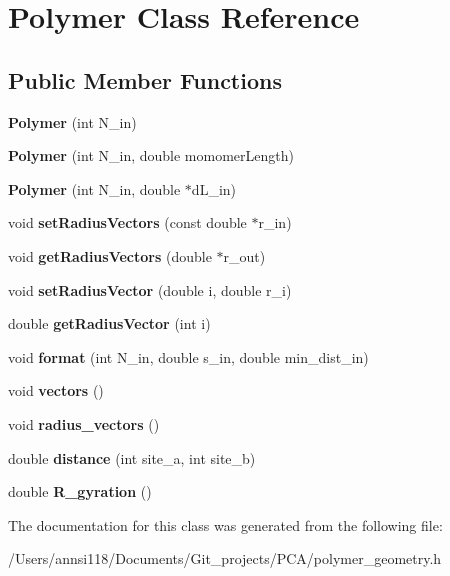 \hypertarget{class_polymer}{}\section{Polymer Class Reference}
\label{class_polymer}
\subsection*{Public Member Functions}
\begin{DoxyCompactItemize}
\item 
\hypertarget{class_polymer_aeef14f876a6b3b31b3be3fd789f9142d}{}\label{class_polymer_aeef14f876a6b3b31b3be3fd789f9142d} 
{\bfseries Polymer} (int N\+\_\+in)
\item 
\hypertarget{class_polymer_ad009faecb341e6aaf21fd425c99c4b70}{}\label{class_polymer_ad009faecb341e6aaf21fd425c99c4b70} 
{\bfseries Polymer} (int N\+\_\+in, double momomer\+Length)
\item 
\hypertarget{class_polymer_ac859321a8dd1b5d78822e98e53645ad3}{}\label{class_polymer_ac859321a8dd1b5d78822e98e53645ad3} 
{\bfseries Polymer} (int N\+\_\+in, double $\ast$d\+L\+\_\+in)
\item 
\hypertarget{class_polymer_ad540918d3d218b44535e590c559c28b9}{}\label{class_polymer_ad540918d3d218b44535e590c559c28b9} 
void {\bfseries set\+Radius\+Vectors} (const double $\ast$r\+\_\+in)
\item 
\hypertarget{class_polymer_ae82c830e6fd23af29f0eed75cffd00ad}{}\label{class_polymer_ae82c830e6fd23af29f0eed75cffd00ad} 
void {\bfseries get\+Radius\+Vectors} (double $\ast$r\+\_\+out)
\item 
\hypertarget{class_polymer_aba8c125cc0c6f2f66f4bb9b5457d004a}{}\label{class_polymer_aba8c125cc0c6f2f66f4bb9b5457d004a} 
void {\bfseries set\+Radius\+Vector} (double i, double r\+\_\+i)
\item 
\hypertarget{class_polymer_a123e7f967d9173b22b2f86a36062a0da}{}\label{class_polymer_a123e7f967d9173b22b2f86a36062a0da} 
double {\bfseries get\+Radius\+Vector} (int i)
\item 
\hypertarget{class_polymer_a625eaf1280ab523a07fa666ab9f8c69b}{}\label{class_polymer_a625eaf1280ab523a07fa666ab9f8c69b} 
void {\bfseries format} (int N\+\_\+in, double s\+\_\+in, double min\+\_\+dist\+\_\+in)
\item 
\hypertarget{class_polymer_a739c048d8c8a435b7c99d87546e229f9}{}\label{class_polymer_a739c048d8c8a435b7c99d87546e229f9} 
void {\bfseries vectors} ()
\item 
\hypertarget{class_polymer_a33a767148263d05f13d27f045f0183ae}{}\label{class_polymer_a33a767148263d05f13d27f045f0183ae} 
void {\bfseries radius\+\_\+vectors} ()
\item 
\hypertarget{class_polymer_a2c0414e2abaffa050d4b567dcc7a93fe}{}\label{class_polymer_a2c0414e2abaffa050d4b567dcc7a93fe} 
double {\bfseries distance} (int site\+\_\+a, int site\+\_\+b)
\item 
\hypertarget{class_polymer_a2e53583c5608a6b50816de217b56cb62}{}\label{class_polymer_a2e53583c5608a6b50816de217b56cb62} 
double {\bfseries R\+\_\+gyration} ()
\end{DoxyCompactItemize}


The documentation for this class was generated from the following file\+:\begin{DoxyCompactItemize}
\item 
/\+Users/annsi118/\+Documents/\+Git\+\_\+projects/\+P\+C\+A/polymer\+\_\+geometry.\+h\end{DoxyCompactItemize}

